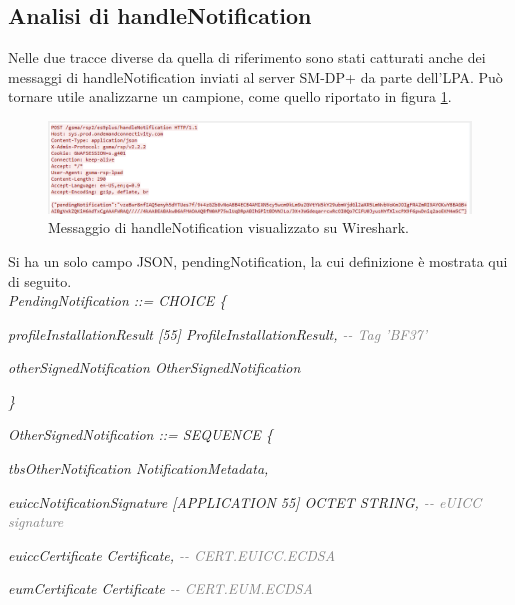 \documentclass[10pt, oneside]{book}
\begin{document}
\subsection{Analisi di handleNotification}
Nelle due tracce diverse da quella di riferimento sono stati catturati anche dei messaggi di handleNotification inviati al server SM-DP+ da parte dell'LPA. Può tornare utile analizzarne un campione, come quello riportato in figura \ref{fig:msg7-stream-pcap}.\\
\begin{figure}
\includegraphics[width=\linewidth]{msg7-stream-pcap.png}
\caption{Messaggio di handleNotification visualizzato su Wireshark.}
\label{fig:msg7-stream-pcap}
\end{figure}
Si ha un solo campo JSON, pendingNotification, la cui definizione è mostrata qui di seguito.\\

\textit{PendingNotification ::= CHOICE \{}

\hspace{0.75cm} \textit{profileInstallationResult [55] ProfileInstallationResult, \textcolor{gray}{{-}{-} Tag 'BF37'}}

\hspace{0.75cm} \textit{otherSignedNotification OtherSignedNotification}

\textit{\}\\}

\textit{OtherSignedNotification ::= SEQUENCE \{}

\hspace{0.75cm} \textit{tbsOtherNotification NotificationMetadata,}

\hspace{0.75cm} \textit{euiccNotificationSignature [APPLICATION 55] OCTET STRING, \textcolor{gray}{{-}{-} eUICC signature}}

\hspace{0.75cm} \textit{euiccCertificate Certificate, \textcolor{gray}{{-}{-} CERT.EUICC.ECDSA}}

\hspace{0.75cm} \textit{eumCertificate Certificate \textcolor{gray}{{-}{-} CERT.EUM.ECDSA}}
\end{document}

